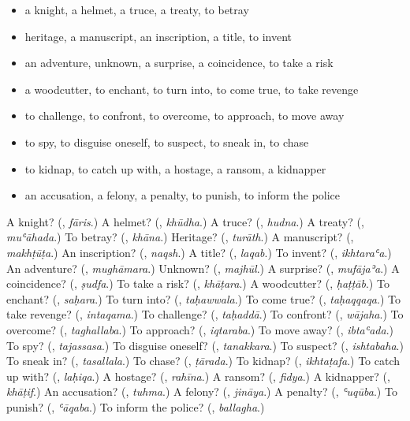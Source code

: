 \begin{itemize}
\raggedright
  \item a knight, a helmet, a truce, a treaty, to betray
  \item heritage, a manuscript, an inscription, a title, to invent
  \item an adventure, unknown, a surprise, a coincidence, to take a risk
  \item a woodcutter, to enchant, to turn into, to come true, to take revenge
  \item to challenge, to confront, to overcome, to approach, to move away
  \item to spy, to disguise oneself, to suspect, to sneak in, to chase
  \item to kidnap, to catch up with, a hostage, a ransom, a kidnapper
  \item an accusation, a felony, a penalty, to punish, to inform the police
\end{itemize}

\begin{tcolorbox}[breakable,colback=teal!4,colframe=teal!35!black,title={Before you move on}]
A knight? (\textbf{}, \emph{fāris}.) A helmet? (\textbf{}, \emph{khūdha}.) A truce? (\textbf{}, \emph{hudna}.) A treaty? (\textbf{}, \emph{muʿāhada}.) To betray? (\textbf{}, \emph{khāna}.) Heritage? (\textbf{}, \emph{turāth}.) A manuscript? (\textbf{}, \emph{makhṭūṭa}.) An inscription? (\textbf{}, \emph{naqsh}.) A title? (\textbf{}, \emph{laqab}.) To invent? (\textbf{}, \emph{ikhtaraʿa}.) An adventure? (\textbf{}, \emph{mughāmara}.) Unknown? (\textbf{}, \emph{majhūl}.) A surprise? (\textbf{}, \emph{mufājaʾa}.) A coincidence? (\textbf{}, \emph{ṣudfa}.) To take a risk? (\textbf{}, \emph{khāṭara}.) A woodcutter? (\textbf{}, \emph{ḥaṭṭāb}.) To enchant? (\textbf{}, \emph{saḥara}.) To turn into? (\textbf{}, \emph{taḥawwala}.) To come true? (\textbf{}, \emph{taḥaqqaqa}.) To take revenge? (\textbf{}, \emph{intaqama}.) To challenge? (\textbf{}, \emph{taḥaddā}.) To confront? (\textbf{}, \emph{wājaha}.) To overcome? (\textbf{}, \emph{taghallaba}.) To approach? (\textbf{}, \emph{iqtaraba}.) To move away? (\textbf{}, \emph{ibtaʿada}.) To spy? (\textbf{}, \emph{tajassasa}.) To disguise oneself? (\textbf{}, \emph{tanakkara}.) To suspect? (\textbf{}, \emph{ishtabaha}.) To sneak in? (\textbf{}, \emph{tasallala}.) To chase? (\textbf{}, \emph{ṭārada}.) To kidnap? (\textbf{}, \emph{ikhtaṭafa}.) To catch up with? (\textbf{}, \emph{laḥiqa}.) A hostage? (\textbf{}, \emph{rahīna}.) A ransom? (\textbf{}, \emph{fidya}.) A kidnapper? (\textbf{}, \emph{khāṭif}.) An accusation? (\textbf{}, \emph{tuhma}.) A felony? (\textbf{}, \emph{jināya}.) A penalty? (\textbf{}, \emph{ʿuqūba}.) To punish? (\textbf{}, \emph{ʿāqaba}.) To inform the police? (\textbf{}, \emph{ballagha}.)
\end{tcolorbox}
